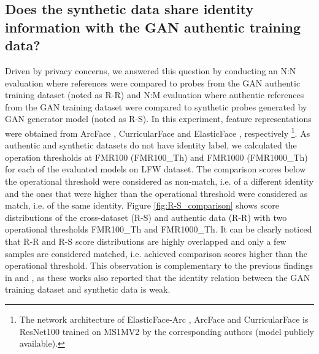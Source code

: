 \documentclass[10pt,twocolumn,letterpaper]{ieeeconf}
\begin{document}
\begin{table}[h!]
\caption{Verification accuracies (\%) of two data augmentation settings on five different FR benchmarks. HF refers to horizontal-flipping. Adding GAN-based augmentations enhances the accuracy of the resulting FR model, which will be referred to as "baseline". Higher accuracy in bold.
}
\label{tab:HF_and_GAN}
\vspace{-4mm}
\end{table}

\subsection{Does the synthetic data share identity information with the GAN authentic training  data?}
Driven by privacy concerns, we answered this question by conducting an N:N evaluation where references were compared to probes from the GAN authentic training dataset (noted as R-R) and N:M evaluation where authentic references from the GAN training dataset were compared to synthetic probes generated by GAN generator model (noted as R-S). In this experiment, feature representations were obtained from ArcFace \cite{ArcFace}, CurricularFace \cite{CurricularFace} and ElasticFace \cite{ElasticFace}, respectively \footnote{The network architecture of ElasticFace-Arc \cite{ElasticFace}, ArcFace  \cite{ArcFace} and CurricularFace \cite{CurricularFace} is ResNet100 trained on MS1MV2 \cite{MS-Celeb-1M} by the corresponding authors (model publicly available).}. As authentic and synthetic datasets do not have identity label, we calculated the operation thresholds at FMR100 (FMR100\_Th) and FMR1000 (FMR1000\_Th) for each of the evaluated models on LFW dataset.
The comparison scores below the operational threshold were considered as non-match, i.e. of a different identity and the ones that were higher than the operational threshold were considered as match, i.e. of the same identity. 
Figure \ref{fig:R-S_comparison} shows score distributions of the cross-dataset (R-S) and authentic data (R-R) with two operational thresholds FMR100\_Th and  FMR1000\_Th. It can be clearly noticed that R-R and R-S score distributions are highly overlapped and only a few samples are considered matched, i.e. achieved comparison scores higher than the operational threshold. This observation is complementary to the previous findings in \cite{ThisFaceDoesNotExist} and \cite{SFace}, as these works also reported that the identity relation between the GAN training dataset and synthetic data is weak. 
\end{document}
